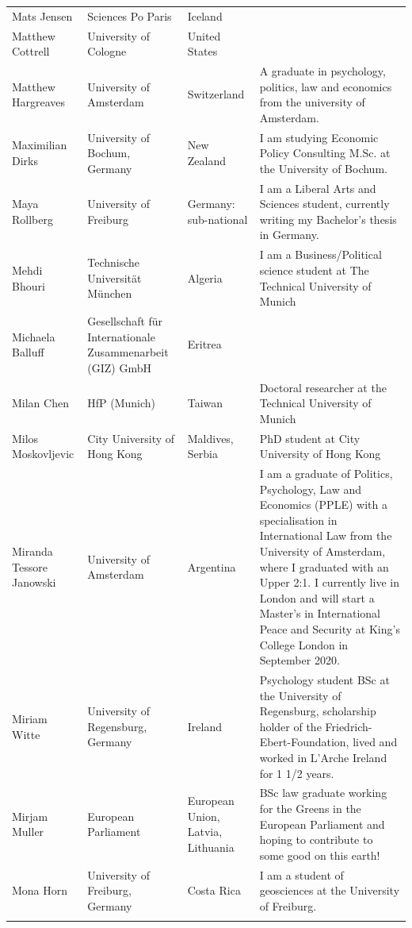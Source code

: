 \documentclass[]{article}
\begin{document}
\begin{longtable}{l>{\raggedright\arraybackslash}p{2cm}>{\raggedright\arraybackslash}p{2cm}>{\raggedright\arraybackslash}p{3cm}}
Mats Jensen & Sciences Po Paris & Iceland & \\
\rowcolor{gray!6}  Matthew Cottrell & University of Cologne & United States & \\
Matthew Hargreaves & University of Amsterdam & Switzerland & A graduate in psychology, politics, law and economics from the university of Amsterdam.\\
\addlinespace
\rowcolor{gray!6}  Maximilian Dirks & University of Bochum, Germany & New Zealand & I am studying Economic Policy Consulting M.Sc. at the University of Bochum.\\
Maya Rollberg & University of Freiburg & Germany: sub-national & I am a Liberal Arts and Sciences student, currently writing my Bachelor's thesis in Germany.\\
\rowcolor{gray!6}  Mehdi Bhouri & Technische Universität München & Algeria & I am a Business/Political science student at The Technical University of Munich\\
Michaela Balluff & Gesellschaft für Internationale Zusammenarbeit (GIZ) GmbH & Eritrea & \\
\rowcolor{gray!6}  Milan Chen & HfP (Munich) & Taiwan & Doctoral researcher at the Technical University of Munich\\
\addlinespace
Milos Moskovljevic & City University of Hong Kong & Maldives, Serbia & PhD student at City University of Hong Kong\\
\rowcolor{gray!6}  Miranda Tessore Janowski & University of Amsterdam & Argentina & I am a graduate of Politics, Psychology, Law and Economics (PPLE) with a specialisation in International Law from the University of Amsterdam, where I graduated with an Upper 2:1. I currently live in London and will start a Master's in International Peace and Security at King's College London in September 2020.\\
Miriam Witte & University of Regensburg, Germany & Ireland & Psychology student BSc at the University of Regensburg, scholarship holder of the Friedrich-Ebert-Foundation, lived and worked in L'Arche Ireland for 1 1/2 years.\\
\rowcolor{gray!6}  Mirjam Muller & European Parliament & European Union, Latvia, Lithuania & BSc law graduate working for the Greens in the European Parliament and hoping to contribute to some good on this earth!\\
Mona Horn & University of Freiburg, Germany & Costa Rica & I am a student of geosciences at the University of Freiburg.\\
\addlinespace

\end{longtable}
\end{document}
